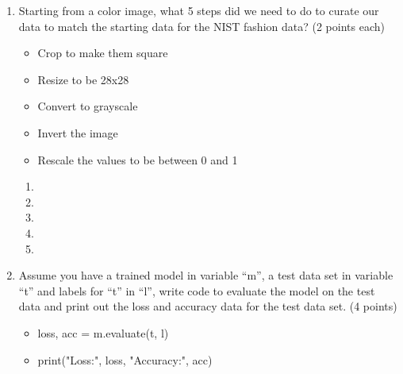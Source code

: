 \documentclass[10pt]{article}
\begin{document}
\begin{enumerate}
\begin{enumerate}
	\item Starting from a color image, what 5 steps did we need to do to curate our data to match the starting data for the NIST fashion data? (2 points each)
\beginanswers
\begin{itemize}
	\item Crop to make them square
	\item Resize to be 28x28
	\item Convert to grayscale
	\item Invert the image
	\item Rescale the values to be between 0 and 1
\end{itemize}
\else
\begin{enumerate}
	\item 
\bigskip
\bigskip
\bigskip
\bigskip
	\item 
\bigskip
\bigskip
\bigskip
\bigskip
	\item 
\bigskip
\bigskip
\bigskip
\bigskip
	\item 
\bigskip
\bigskip
\bigskip
\bigskip	
	\item 
\bigskip
\bigskip
\bigskip
\bigskip	
\end{enumerate}
\fi
\bigskip
\bigskip
\bigskip
\bigskip	

\item Assume you have a trained model in variable ``m'', a test data set in variable ``t'' and labels for ``t'' in ``l'', write code to evaluate the model on the test data and print out the loss and accuracy data for the test data set. (4 points)

\beginanswers
\begin{itemize}
	\item loss, acc = m.evaluate(t, l)
	\item print("Loss:", loss, "Accuracy:", acc)
\end{itemize}
\else
\bigskip
\bigskip
\bigskip
\bigskip
\bigskip
\bigskip
\bigskip
\bigskip
\bigskip
\bigskip
\bigskip
\fi
\end{enumerate}

\end{enumerate}
\end{document}
